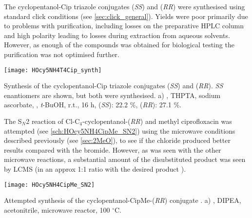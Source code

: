 The cyclopentanol-Cip triazole conjugates  (\textit{SS}) and  (\textit{RR}) were synthesised using standard click conditions (see \ref{sec:click_general}). Yields were poor primarily due to problems with purification, including losses on the preparative HPLC column and high polarity leading to losses during extraction from aqueous solvents. However, as enough of the compounds was obtained for biological testing the purification was not optimised further.

\begin{scheme}[H]
	\begin{center}
		\texttt{[image: HOcy5NH4T4Cip\_synth]}
		\caption{Synthesis of the cyclopentanol-Cip triazole conjugates  (\textit{SS}) and 
		 (\textit{RR}). 
		\textit{SS} enantiomers are shown, but both were synthesised.
		a) , THPTA, sodium ascorbate, , \textit{t}-BuOH, r.t., 16 h, 
		 (\textit{SS}): 22.2 \%,
		 (\textit{RR}): 27.1 \%. 
		\label{sch:HOcy5NH4T4Cip_synth}}
	\end{center}
\end{scheme}

The S$_N$2 reaction of Cl-C$_4$-cyclopentanol-(\textit{RR})  and methyl ciprofloxacin  was attempted (see \ref{sch:HOcy5NH4CipMe_SN2}) using the microwave conditions described previously (see \ref{sec:2MeO}), to see if the chloride produced better results compared with the bromide. However, as was seen with the other microwave reactions, a substantial amount of the disubstituted product  was seen by LCMS (in an approx 1:1 ratio with the desired product ). 

\begin{scheme}[H]
	\begin{center}
		\texttt{[image: HOcy5NH4CipMe\_SN2]}
		\caption{Attempted synthesis of the cyclopentanol-CipMe-(\textit{RR}) conjugate .
		a) , DIPEA, acetonitrile, microwave reactor, 100 $^{\circ}$C.
		\label{sch:HOcy5NH4CipMe_SN2}}
	\end{center}
\end{scheme}

